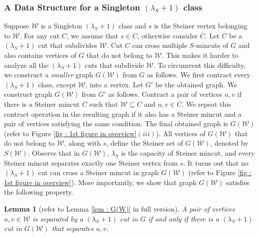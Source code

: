 \documentclass[letterpaper,11pt]{article}
\newtheorem{lemma}{Lemma}[]
\begin{document}
\subsubsection{A Data Structure for a Singleton $(\lambda_S+1)$ class} \label{sec : overview : singleton data structure}
Suppose ${\mathcal W}$ is a Singleton $(\lambda_S+1)$ class and $s$ is the Steiner vertex belonging to ${\mathcal W}$. For any cut $C$, we assume that $s\in C$, otherwise consider $\overline{C}$. Let $C$ be a $(\lambda_S+1)$ cut that subdivides ${\mathcal W}$. Cut $C$ can cross multiple $S$-mincuts of $G$ and also contains vertices of $G$ that do not belong to ${\mathcal W}$. This makes it harder to analyze all the $(\lambda_S+1)$ cuts that subdivide ${\mathcal W}$. To circumvent this difficulty, we construct a \textit{smaller} graph $G({\mathcal W})$ from $G$ as follows. 
We first contract every $(\lambda_S+1)$ class, except ${\mathcal W}$, into a vertex. Let $G'$ be the obtained graph. We construct graph $G({\mathcal W})$ from $G'$ as follows. Contract a pair of vertices $u,v$ if there is a Steiner mincut $C$ such that ${\mathcal W}\subseteq C$ and $u,v\in \overline{C}$. We repeat this contract operation in the resulting graph if it also has a Steiner mincut and a pair of vertices satisfying the same condition. The final obtained graph is $G({\mathcal W})$ (refer to Figure \ref{fig : 1st figure in overview}$(iii)$).
All vertices of $G({\mathcal W})$ that do not belong to ${\mathcal W}$, along with $s$, define the Steiner set of $G({\mathcal W})$, denoted by $S({\mathcal W})$.
Observe that in $G({\mathcal W})$, $\lambda_S$ is the capacity of Steiner mincut, and every Steiner mincut separates exactly one Steiner vertex from $s$.
It turns out that no $(\lambda_S+1)$ cut can cross a Steiner mincut in graph $G({\mathcal W})$ (refer to Figure \ref{fig : 1st figure in overview}). More importantly, we show that graph $G({\mathcal W})$ satisfies the following property.
\begin{lemma}[refer to Lemma \ref{lem : G(W)} in full version]
    A pair of vertices $u,v\in {\mathcal W}$ is separated by a $(\lambda_S+1)$ cut in $G$ if and only if there is a $(\lambda_S+1)$ cut in $G({\mathcal W})$ that separates $u,v$.
\end{lemma}
\end{document}
